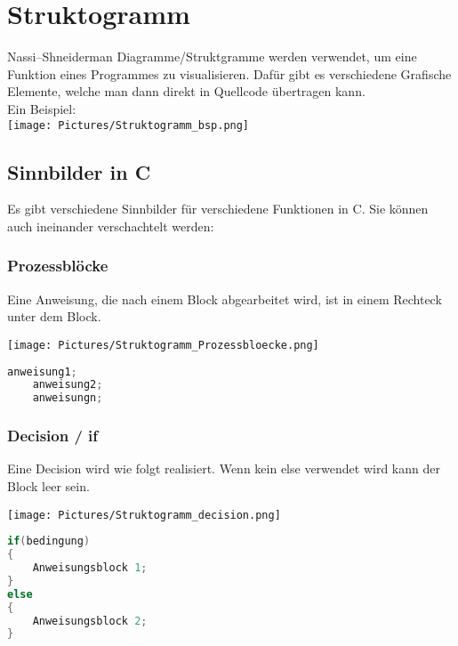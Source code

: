 \section{Struktogramm}

Nassi–Shneiderman Diagramme/Struktgramme werden verwendet, um eine Funktion eines Programmes zu visualisieren. Dafür gibt es verschiedene Grafische Elemente, welche man dann direkt in Quellcode übertragen kann.\\
Ein Beispiel:\\

\texttt{[image: Pictures/Struktogramm\_bsp.png]}

\subsection{Sinnbilder in C}

Es gibt verschiedene Sinnbilder für verschiedene Funktionen in C. Sie können auch ineinander verschachtelt werden:

\subsubsection{Prozessblöcke}

Eine Anweisung, die nach einem Block abgearbeitet wird, ist in einem Rechteck unter dem Block. \\

\noindent
\begin{minipage}{0.2\columnwidth} 
    \texttt{[image: Pictures/Struktogramm\_Prozessbloecke.png]}
\end{minipage}
\begin{minipage}{0.75\columnwidth} 
\begin{lstlisting}[language = c]
    anweisung1;
    anweisung2;
    anweisungn;
\end{lstlisting}
\end{minipage}

\subsubsection{Decision / if}

Eine Decision wird wie folgt realisiert. Wenn kein else verwendet wird kann der Block leer sein.\\

\noindent
\begin{minipage}{0.4\columnwidth} 
\texttt{[image: Pictures/Struktogramm\_decision.png]}
\end{minipage}
\begin{minipage}{0.6\columnwidth} 
\begin{lstlisting}[language = c]
if(bedingung)
{
    Anweisungsblock 1;
}
else
{
    Anweisungsblock 2;
}
\end{lstlisting}
\end{minipage}

